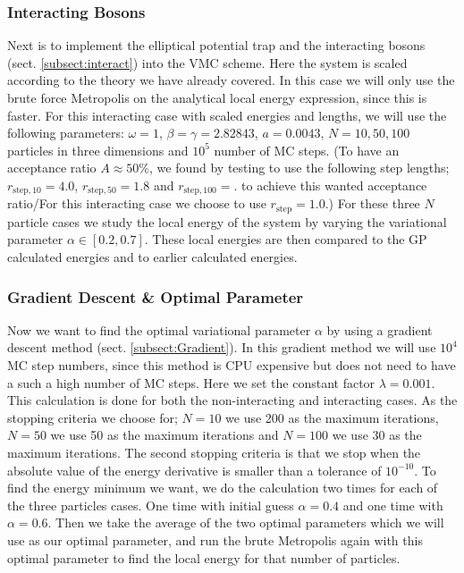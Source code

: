 \documentclass[12pt,a4paper,english]{article}
\begin{document}
\subsubsection{Interacting Bosons}
\label{subsubsect:Coding_int}
Next is to implement the elliptical potential trap and the interacting bosons (sect. \ref{subsect:interact}) into the VMC scheme. Here the system is scaled according to the theory we have already covered. In this case we will only use the brute force Metropolis on the analytical local energy expression, since this is faster. For this interacting case with scaled energies and lengths, we will use the following parameters: $\omega=1$, $\beta=\gamma=2.82843$, $a=0.0043$, $N=10,50,100$ particles in three dimensions and $10^5$ number of MC steps. (To have an acceptance ratio $A\approx 50$\%, we found by testing to use the following step lengths; $r_{\text{step},10}=4.0$, $r_{\text{step},50}=1.8$ and $r_{\text{step},100}=.$ to achieve this wanted acceptance ratio/For this interacting case we choose to use $r_{\text{step}}=1.0$.) For these three $N$ particle cases we study the local energy of the system by varying the variational parameter $\alpha\in[0.2,0.7]$. These local energies are then compared to the GP calculated energies and to earlier calculated energies.

\subsubsection{Gradient Descent \& Optimal Parameter}
\label{subsubsect:Coding_gradient}
Now we want to find the optimal variational parameter $\alpha$ by using a gradient descent method (sect. \ref{subsect:Gradient}). In this gradient method we will use $10^4$ MC step numbers, since this method is CPU expensive but does not need to have a such a high number of MC steps. Here we set the constant factor $\lambda=0.001$. This calculation is done for both the non-interacting and interacting cases. As the stopping criteria we choose for; $N=10$ we use 200 as the maximum iterations, $N=50$ we use 50 as the maximum iterations and $N=100$ we use 30 as the maximum iterations. The second stopping criteria is that we stop when the absolute value of the energy derivative is smaller than a tolerance of $10^{-10}$. To find the energy minimum we want, we do the calculation two times for each of the three particles cases. One time with initial guess $\alpha=0.4$ and one time with $\alpha=0.6$. Then we take the average of the two optimal parameters which we will use as our optimal parameter, and run the brute Metropolis again with this optimal parameter to find the local energy for that number of particles.
\end{document}
